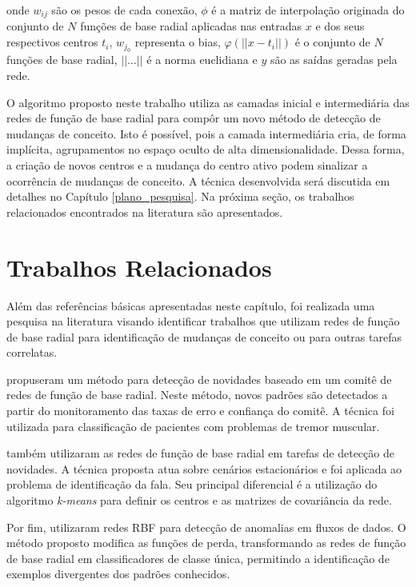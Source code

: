 \documentclass[qual, classic, a4paper]{ufbathesis}
\begin{document}
onde $w_{ij}$ são os pesos de cada conexão, $\phi$ é a matriz de interpolação originada do conjunto de $N$ funções
de base radial aplicadas nas entradas $x$ e dos seus respectivos centros $t_i$,
$w_{j_0}$ representa o bias, $\varphi (||{{x}}-{{t}}_{i}||)$ é o conjunto de $N$ funções de base radial,
$||\ldots||$ é a norma euclidiana e $y$ são as saídas geradas pela rede.

O algoritmo proposto neste trabalho utiliza as camadas inicial e intermediária das redes de função de base radial para compôr um novo método de detecção de mudanças de conceito.
Isto é possível, pois a camada intermediária cria, de forma implícita, agrupamentos no espaço oculto de alta dimensionalidade.
Dessa forma, a criação de novos centros e a mudança do centro ativo podem sinalizar a ocorrência de mudanças de conceito.
A técnica desenvolvida será discutida em detalhes no Capítulo \ref{plano_pesquisa}.
Na próxima seção, os trabalhos relacionados encontrados na literatura são apresentados.

\section{Trabalhos Relacionados}

Além das referências básicas apresentadas neste capítulo, foi realizada uma pesquisa na literatura visando identificar trabalhos 
que utilizam redes de função de base radial para identificação de mudanças de conceito ou para outras tarefas correlatas.

 propuseram um método para detecção de novidades baseado em um comitê de redes de função de base radial.
Neste método, novos padrões são detectados a partir do monitoramento das taxas de erro e confiança do comitê.
A técnica foi utilizada para classificação de pacientes com problemas de tremor muscular.

 também utilizaram as redes de função de base radial em tarefas de detecção de novidades.
A técnica proposta atua sobre cenários estacionários e foi aplicada ao problema de identificação da fala.
Seu principal diferencial é a utilização do algoritmo \textit{k-means} para definir os centros e as matrizes de covariância da rede.

Por fim,  utilizaram redes RBF para detecção de anomalias em fluxos de dados.
O método proposto modifica as funções de perda, transformando as redes de função de base radial em classificadores de classe única, 
permitindo a identificação de exemplos divergentes dos padrões conhecidos.
\end{document}
